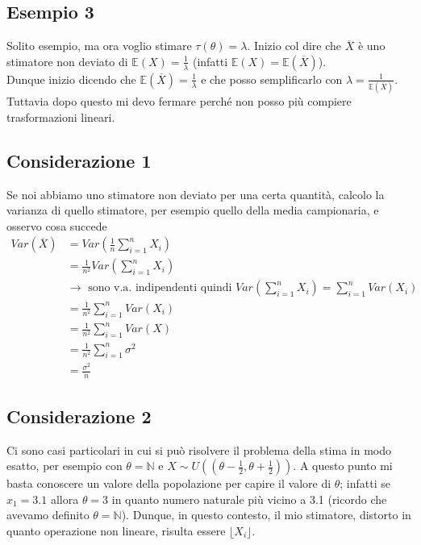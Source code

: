 \documentclass[11pt]{report}
\begin{document}
\subsection{Esempio 3}
Solito esempio, ma ora voglio stimare $\tau(\theta) = \lambda$. Inizio col dire che $\overline{X}$ è uno stimatore non deviato di $\mathbb{E}(X) = \frac{1}{\lambda}$ (infatti $\mathbb{E}(X) = \mathbb{E}(\overline{X})$).\\
Dunque inizio dicendo che $\mathbb{E}(\overline{X}) = \frac{1}{\lambda}$ e che posso semplificarlo con $\lambda = \frac{1}{\mathbb{E}(\overline{X})}$. Tuttavia dopo questo mi devo fermare perché non posso più compiere trasformazioni lineari.

\subsection{Considerazione 1}
Se noi abbiamo uno stimatore non deviato per una certa quantità, calcolo la varianza di quello stimatore, per esempio quello della media campionaria, e osservo cosa succede
\begin{equation}
    \begin{split}
        Var(\overline{X}) & = Var \left( \frac{1}{n} \sum_{i=1}^n X_i \right)\\
        & = \frac{1}{n^2} Var \left( \sum_{i=1}^n X_i \right)\\
        & \rightarrow \text{ sono v.a. indipendenti quindi } Var \left( \sum_{i=1}^n X_i \right) = \sum_{i=1}^n Var(X_i)\\
        & = \frac{1}{n^2} \sum_{i=1}^n Var(X_i)\\
        & = \frac{1}{n^2} \sum_{i=1}^n Var(X)\\
        & = \frac{1}{n^2} \sum_{i=1}^n \sigma^2\\
        & = \frac{\sigma^2}{n}
    \end{split}
\end{equation}

\subsection{Considerazione 2}
Ci sono casi particolari in cui si può risolvere il problema della stima in modo esatto, per esempio con $\theta = \mathbb{N}$ e $X \sim U((\theta - \frac{1}{2}, \theta + \frac{1}{2}))$. A questo punto mi basta conoscere un valore della popolazione per capire il valore di $\theta$; infatti se $x_1 = 3.1$ allora $\theta = 3$ in quanto numero naturale più vicino a 3.1 (ricordo che avevamo definito $\theta = \mathbb{N}$). Dunque, in questo contesto, il mio stimatore, distorto in quanto operazione non lineare, risulta essere $\lfloor X_i \rfloor$.
\end{document}
